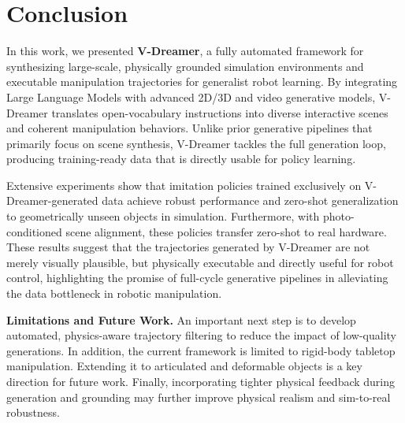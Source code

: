 \section{Conclusion}
\label{sec:conclusion}
In this work, we presented \textbf{V-Dreamer}, a fully automated framework for synthesizing large-scale, physically grounded simulation environments and executable manipulation trajectories for generalist robot learning. By integrating Large Language Models with advanced 2D/3D and video generative models, V-Dreamer translates open-vocabulary instructions into diverse interactive scenes and coherent manipulation behaviors. Unlike prior generative pipelines that primarily focus on scene synthesis, V-Dreamer tackles the full generation loop, producing training-ready data that is directly usable for policy learning. 

Extensive experiments show that imitation policies trained exclusively on V-Dreamer-generated data achieve robust performance and zero-shot generalization to geometrically unseen objects in simulation. Furthermore, with photo-conditioned scene alignment, these policies transfer zero-shot to real hardware. These results suggest that the trajectories generated by V-Dreamer are not merely visually plausible, but physically executable and directly useful for robot control, highlighting the promise of full-cycle generative pipelines in alleviating the data bottleneck in robotic manipulation.

\textbf{Limitations and Future Work.}
An important next step is to develop automated, physics-aware trajectory filtering to reduce the impact of low-quality generations. In addition, the current framework is limited to rigid-body tabletop manipulation. Extending it to articulated and deformable objects is a key direction for future work. Finally, incorporating tighter physical feedback during generation and grounding may further improve physical realism and sim-to-real robustness.